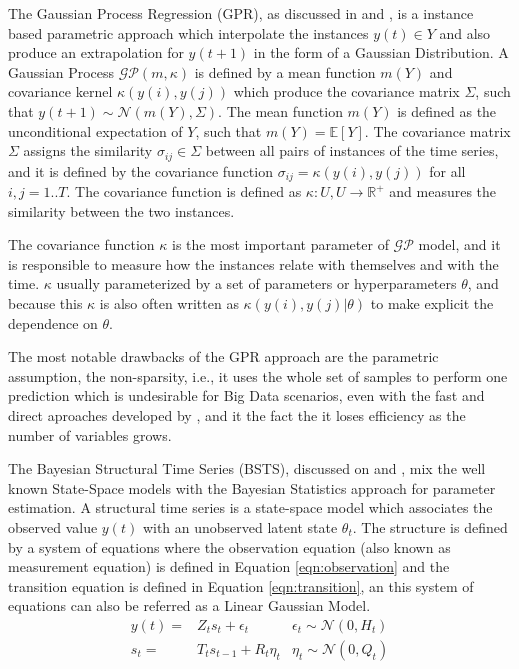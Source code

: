 The Gaussian Process Regression (GPR), as discussed in \cite{Rasmussen2006} and \cite{Roberts2013}, is a instance based parametric approach which interpolate the instances $y(t) \in Y$ and also produce an extrapolation for $y(t+1)$ in the form of a Gaussian Distribution. A Gaussian Process $\mathcal{GP}(m,\kappa)$ is defined by a mean function $m(Y)$ and covariance kernel $\kappa(y(i),y(j))$ which produce the covariance matrix $\Sigma$, such that $y(t+1) \sim \mathcal{N}(m(Y),\Sigma)$. The mean function $m(Y)$ is defined as the unconditional expectation of $Y$, such that $m(Y) = \mathbb{E}[Y]$. The covariance matrix $\Sigma$ assigns the similarity $\sigma_{ij} \in \Sigma$ between all pairs of instances of the time series, and it is defined by the covariance function $\sigma_{ij} = \kappa(y(i),y(j))$ for all $i,j = 1..T$. The covariance function is defined as $\kappa: U,U \rightarrow \mathbb{R}^+$ and measures the similarity between the two instances. 

The covariance function $\kappa$ is the most important parameter of $\mathcal{GP}$ model, and it is responsible to measure how the instances relate with themselves and with the time. $\kappa$ usually parameterized by a set of parameters or hyperparameters $\theta$, and because this $\kappa$ is also often written as $\kappa(y(i),y(j)|\theta)$ to make explicit the dependence on $\theta$. 

The most notable drawbacks of the GPR approach are the parametric assumption, the non-sparsity, i.e., it uses the whole set of samples to perform one prediction which is undesirable for Big Data scenarios, even with the fast and direct aproaches developed by \cite{Ambikasaran2014}, and it the fact the it loses efficiency as the number of variables grows.


The Bayesian Structural Time Series (BSTS), discussed on \cite{Scott2014} and \cite{Barber2011a}, mix the well known State-Space models with the Bayesian Statistics approach for parameter estimation. A structural time series is a state-space model which associates the observed value $y(t)$ with an unobserved latent state  $\theta_t$. The structure is defined by a system of equations where the observation equation (also known as measurement equation) is defined in Equation \ref{eqn:observation} and the transition equation is defined in Equation \ref{eqn:transition}, an this system of equations can also be referred as a Linear Gaussian Model. 
\begin{align}
    y(t)  = & Z_ts_t + \epsilon_t & \epsilon_t \sim \mathcal{N}(0, H_t) \label{eqn:observation} \\
    s_t  = & T_t s_{t-1} + R_t\eta_t & \eta_t \sim \mathcal{N}(0, Q_t)  \label{eqn:transition}
\end{align}

